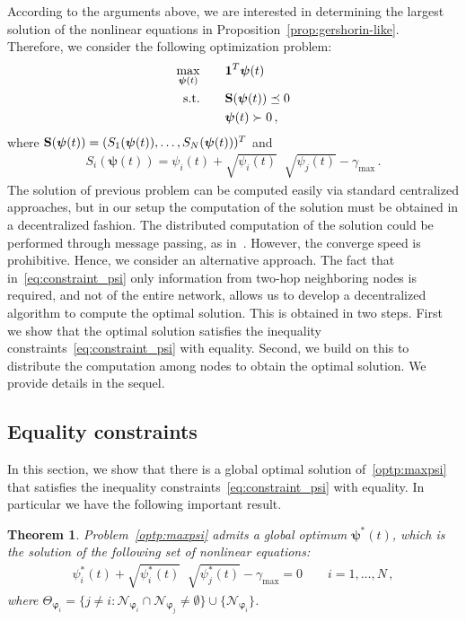 \documentclass[a4paper,notitlepage,onecolumn]{article}
\def\1{\mathbf{1}}
\def\S{{\bf S}}
\def\psib{\boldsymbol{\psi}}
\def\varphib{\boldsymbol{\varphi}}
\newtheorem{theorem}{Theorem}[section]
\numberwithin{equation}{section}
\begin{document}
According to the arguments above, we are interested in determining
the largest solution of the nonlinear equations in
Proposition~\ref{prop:gershorin-like}. Therefore, we consider the
following optimization problem:
\begin{align}
    \max_{\psib(t)}\qquad & \1^T\psib(t) \label{optp:maxpsi}  \\
    \mathrm{s.t.} \qquad & \S(\psib(t)) \preceq 0 \label{eq:constraint_psi} \\
    &\psib(t) \succ 0 \nonumber \,,
\end{align}
where $\S(\psib(t))=(S_1(\psib(t)), \ldots, S_N(\psib(t)))^T$ and
\begin{align*}
    S_i(\psib(t))=\psi_i(t) + \sqrt{\psi_i(t)}
    \mathop{\sum_{j\in \Theta_{\varphib_i}}}\sqrt{\psi_j(t)} - \gamma_{\max} \,.
\end{align*}
The solution of previous problem can be computed easily via
standard centralized approaches, but in our setup the computation
of the solution must be obtained in a decentralized fashion. The
distributed computation of the solution could be performed through
message passing, as in~\cite{JohannsonXiao06}. However, the
converge speed is prohibitive. Hence, we consider an alternative
approach. The fact that in~\eqref{eq:constraint_psi} only
information from two-hop neighboring nodes is required, and not of
the entire network, allows us to develop a decentralized algorithm
to compute the optimal solution. This is obtained in two steps.
First we show that the optimal solution satisfies the inequality
constraints~\eqref{eq:constraint_psi} with equality. Second, we build on this to distribute
the computation among nodes to obtain the optimal solution. We
provide details in the sequel.


\subsection{Equality constraints}

In this section, we show that there is a global optimal solution
of~\eqref{optp:maxpsi} that satisfies the inequality
constraints~\eqref{eq:constraint_psi} with equality. In particular
we have the following important result.

\begin{theorem} \label{theo:OP}
Problem~\eqref{optp:maxpsi} admits a global optimum $\psib^*(t)$, which is the solution of the following set of nonlinear equations:
\begin{align}
    \psi_i^*(t) +  \sqrt{\psi_i^*(t)} \mathop{\sum_{j\in
    \Theta_{\varphib_i}}} \sqrt{\psi_j^*(t)} - \gamma_{\max} = 0 \qquad i=1,\dots,N\,,\label{eq:eqconstr}
\end{align}
where $\Theta_{\varphib_i}=\{j\neq i : \mathcal{N}_{\varphib_i}
\cap \mathcal{N}_{\varphib_j} \neq \emptyset\} \cup
\{\mathcal{N}_{\varphib_i} \}$.
\end{theorem}
\end{document}
